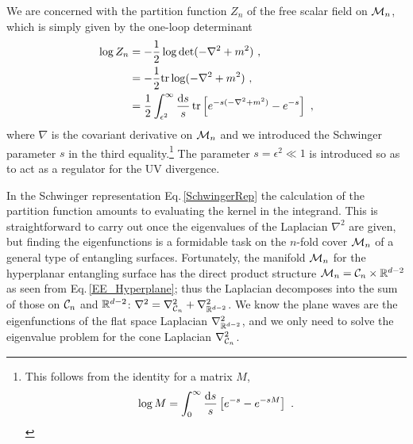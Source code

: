 We are concerned with the partition function $Z_n$ of the free scalar field on ${\cal M}_n$, which is simply given by the one-loop determinant
\begin{align}\label{SchwingerRep}
\begin{aligned}
\log Z_n &= -\frac{1}{2} \log \det (-\nabla^2 + m^2) \ , \\
	&= -\frac{1}{2}{\rm tr} \log (-\nabla^2 + m^2) \ , \\
	&= \frac{1}{2}\int_{\epsilon^2}^\infty \frac{\mathrm{d} s}{s}\, {\rm tr} \left[ e^{-s (-\nabla^2 + m^2)} - e^{-s} \right]\ , 
\end{aligned}
\end{align}
where $\nabla$ is the covariant derivative on ${\cal M}_n$ and we introduced the Schwinger parameter $s$ in the third equality.\footnote{
This follows from the identity for a matrix $M$,
\begin{align}
\log M =  \int_0^\infty \frac{\d s}{s}\left[ e^{-s} - e^{-s M}\right] \ .
\end{align}}
The parameter $s=\epsilon^2\ll 1$ is introduced so as to act as a regulator for the UV divergence.

In the Schwinger representation Eq.\,\eqref{SchwingerRep} the calculation of the partition function amounts to evaluating the kernel in the integrand.
This is straightforward to carry out once the eigenvalues of the Laplacian $\nabla^2$ are given, but finding the eigenfunctions is a formidable task on the $n$-fold cover ${\cal M}_n$ of a general type of entangling surfaces.
Fortunately, the manifold ${\cal M}_n$ for the hyperplanar entangling surface has the direct product structure ${\cal M}_n = {\cal C}_n \times \mathbb{R}^{d-2}$ as seen from Eq.\,\eqref{EE_Hyperplane}; thus the Laplacian decomposes into the sum of those on ${\cal C}_n$ and $\mathbb{R}^{d-2}$: $\nabla^2 = \nabla^2_{{\cal C}_n} + \nabla^2_{\mathbb{R}^{d-2}}$.
We know the plane waves are the eigenfunctions of the flat space Laplacian $\nabla^2_{\mathbb{R}^{d-2}}$, and we only need to solve the eigenvalue problem for the cone Laplacian $\nabla^2_{{\cal C}_n}$.

